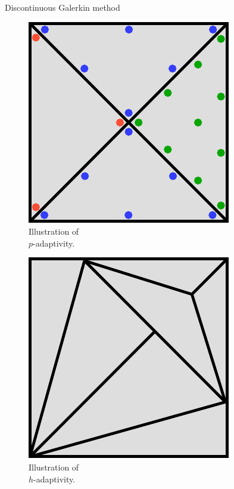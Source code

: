\begin{frame}{Discontinuous Galerkin method}
\begin{overprint}
 \begin{multicols}{2}
   \begin{figure}[H]
     \centering
     \includegraphics[scale=0.3]{image/p_adaptivity.pdf}
     \caption*{Illustration of \\ $p$-adaptivity.}
     \label{p_adapt_sketch}
   \end{figure}
   \columnbreak
   \begin{figure}[H]
     \centering
     \includegraphics[scale=0.3]{image/h_adaptivity.pdf}
     \caption*{Illustration of \\ $h$-adaptivity.}
     \label{h_adapt_sketch}
   \end{figure}
 \end{multicols}



\end{overprint}
\end{frame}
